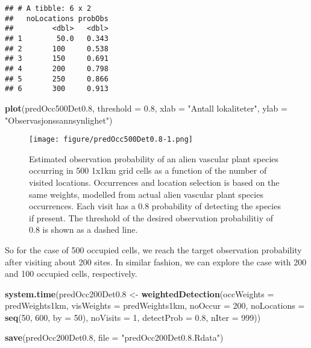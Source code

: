 \documentclass[]{article}
\newenvironment{Shaded}{\begin{snugshade}}{\end{snugshade}}
\newcommand{\KeywordTok}[1]{\textcolor[rgb]{0.13,0.29,0.53}{\textbf{#1}}}
\newcommand{\DataTypeTok}[1]{\textcolor[rgb]{0.13,0.29,0.53}{#1}}
\newcommand{\DecValTok}[1]{\textcolor[rgb]{0.00,0.00,0.81}{#1}}
\newcommand{\FloatTok}[1]{\textcolor[rgb]{0.00,0.00,0.81}{#1}}
\newcommand{\StringTok}[1]{\textcolor[rgb]{0.31,0.60,0.02}{#1}}
\newcommand{\NormalTok}[1]{#1}
\begin{document}
\begin{verbatim}
## # A tibble: 6 x 2
##   noLocations probObs
##         <dbl>   <dbl>
## 1        50.0   0.343
## 2       100     0.538
## 3       150     0.691
## 4       200     0.798
## 5       250     0.866
## 6       300     0.913
\end{verbatim}

\begin{Shaded}
\begin{Highlighting}[]
\KeywordTok{plot}\NormalTok{(predOcc500Det0.}\DecValTok{8}\NormalTok{, }\DataTypeTok{threshold =} \FloatTok{0.8}\NormalTok{, }\DataTypeTok{xlab =} \StringTok{"Antall lokaliteter"}\NormalTok{, }\DataTypeTok{ylab =} \StringTok{"Observasjonssannsynlighet"}\NormalTok{)}
\end{Highlighting}
\end{Shaded}

\begin{figure}
\centering
\texttt{[image: figure/predOcc500Det0.8-1.png]}
\caption{Estimated observation probability of an alien vascular plant
species occurring in 500 1x1km grid cells as a function of the number of
visited locations. Occurrences and location selection is based on the
same weights, modelled from actual alien vascular plant species
occurrences. Each visit has a 0.8 probability of detecting the species
if present. The threshold of the desired observation probabilitiy of 0.8
is shown as a dashed line. \label{predOcc500Det0.8}}
\end{figure}

So for the case of 500 occupied cells, we reach the target observation
probability after visiting about 200 sites. In similar fashion, we can
explore the case with 200 and 100 occupied cells, respectively.

\begin{Shaded}
\begin{Highlighting}[]
\KeywordTok{system.time}\NormalTok{(predOcc200Det0.}\DecValTok{8}\NormalTok{ <-}\StringTok{ }\KeywordTok{weightedDetection}\NormalTok{(}\DataTypeTok{occWeights =}\NormalTok{ predWeights1km, }
    \DataTypeTok{visWeights =}\NormalTok{ predWeights1km, }\DataTypeTok{noOccur =} \DecValTok{200}\NormalTok{, }\DataTypeTok{noLocations =} \KeywordTok{seq}\NormalTok{(}\DecValTok{50}\NormalTok{, }\DecValTok{600}\NormalTok{, }\DataTypeTok{by =} \DecValTok{50}\NormalTok{), }
    \DataTypeTok{noVisits =} \DecValTok{1}\NormalTok{, }\DataTypeTok{detectProb =} \FloatTok{0.8}\NormalTok{, }\DataTypeTok{nIter =} \DecValTok{999}\NormalTok{))}

\KeywordTok{save}\NormalTok{(predOcc200Det0.}\DecValTok{8}\NormalTok{, }\DataTypeTok{file =} \StringTok{"predOcc200Det0.8.Rdata"}\NormalTok{)}
\end{Highlighting}
\end{Shaded}
\end{document}
